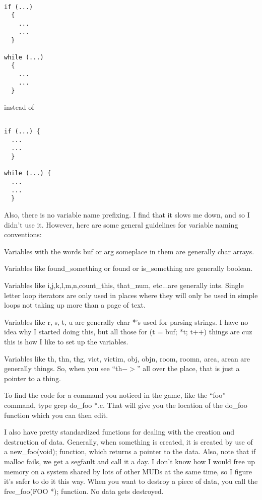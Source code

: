 \begin{verbatim}

if (...)
  {
    ...
    ...
  }

while (...)
  {
    ...
    ...
  }

\end{verbatim}

instead of 

\begin{verbatim}

if (...) {
  ... 
  ...
  }

while (...) {
  ...
  ...
  }

\end{verbatim}


Also, there is no variable name prefixing. I find that it slows me down, and
so I didn't use it. However, here are some general guidelines for variable naming conventions:

Variables with the words buf or arg someplace in them are generally char arrays.

Variables like found\_something or found or is\_something are generally boolean.

Variables like i,j,k,l,m,n,count\_this, that\_num, etc...are generally ints.
Single letter loop iterators are only used in places where they will
only be used in simple loops not taking up more than a page of text.

Variables like r, s, t, u are generally char *'s used for parsing
strings. I have no idea why I started doing this, but all those for (t
= buf; *t; t++) things are cuz this is how I like to set up the
variables.

Variables like th, thn, thg, vict, victim, obj, objn, room, roomn,
area, arean are generally things. So, when you see ``th$->$'' all over
the place, that is just a pointer to a thing.

To find the code for a command you noticed in the game, like the
``foo'' command, type grep do\_foo *.c. That will give you the
location of the do\_foo function which you can then edit.

I also have pretty standardized functions for dealing with the
creation and destruction of data. Generally, when something is
created, it is created by use of a new\_foo(void); function, which
returns a pointer to the data. Also, note that if malloc fails, we get
a segfault and call it a day. I don't know how I would free up memory
on a system shared by lots of other MUDs at the same time, so I figure
it's safer to do it this way. When you want to destroy a piece of
data, you call the free\_foo(FOO *); function. No data gets destroyed.

